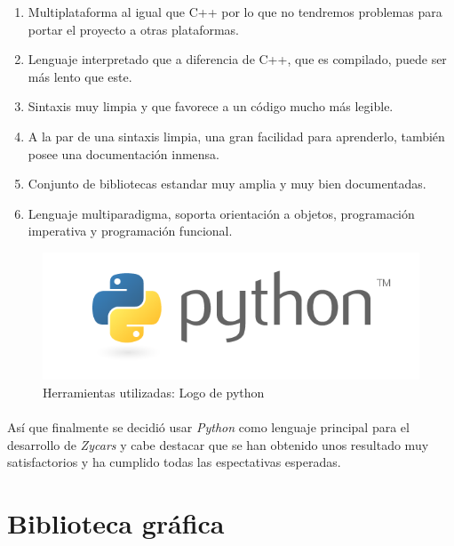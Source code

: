 \begin{enumerate}
    \item Multiplataforma al igual que C++ por lo que no tendremos problemas para portar el proyecto a otras plataformas.
    
    \item Lenguaje interpretado que a diferencia de C++, que es compilado, puede ser más lento que este.
    
    \item Sintaxis muy limpia y que favorece a un código mucho más legible.
    
    \item A la par de una sintaxis limpia, una gran facilidad para aprenderlo, también posee una documentación inmensa.
    
    \item Conjunto de bibliotecas estandar muy amplia y muy bien documentadas.
    
    \item Lenguaje multiparadigma, soporta orientación a objetos, programación imperativa y programación funcional.
\end{enumerate}

\begin{figure}[H]
  \label{logo_python}
  \begin{center}
    \includegraphics[scale=0.4]{imagenes/logo_python.png}
  \end{center}
  \caption{Herramientas utilizadas: Logo de python}
\end{figure}

\paragraph{}
Así que finalmente se decidió usar \emph{Python} como lenguaje principal para el desarrollo de \emph{Zycars} y cabe destacar que se han obtenido
unos resultado muy satisfactorios y ha cumplido todas las espectativas esperadas.

\section{Biblioteca gráfica}

